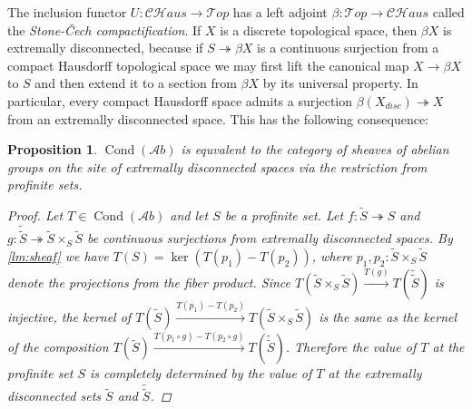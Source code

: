 \documentclass[11pt,A4]{article}
\theoremstyle{plain}
\newtheorem{prop}[thm]{Proposition}
\theoremstyle{definition}
\theoremstyle{remark}
\newcommand{\Top}{\mathscr{T}op}
\newcommand{\CHaus}{\mathscr{CH}aus}
\newcommand{\Ab}{\mathscr{A}b}
\DeclareMathOperator{\Cond}{Cond}
\newcommand{\fp}[1]{\times_{#1}}
\begin{document}
The inclusion functor $U\colon \CHaus\to \Top$ has a left adjoint $\beta\colon \Top\to \CHaus$ called the \textit{Stone-\v{C}ech compactification}.
If $X$ is a discrete topological space, then $\beta X$ is extremally disconnected, because if $S\twoheadrightarrow \beta X$ is a continuous surjection from a compact Hausdorff topological space we may first lift the canonical map $X\to \beta X$ to $S$ and then extend it to a section from $\beta X$ by its universal property.
In particular, every compact Hausdorff space admits a surjection $\beta(X_{disc})\twoheadrightarrow X$ from an extremally disconnected space.
This has the following consequence:

\begin{prop}
    $\Cond(\Ab)$ is equvalent to the category of sheaves of abelian groups on the site of extremally disconnected spaces via the restriction from profinite sets.
    \begin{proof}
	Let $T\in \Cond(\Ab)$ and let $S$ be a profinite set.
	Let $f\colon \tilde{S}\twoheadrightarrow S$ and $g\colon \tilde{\tilde{S}}\twoheadrightarrow \tilde{S}\fp{S}\tilde{S}$ be continuous surjections from extremally disconnected spaces.
	By \cref{lm:sheaf} we have $T(S)=\ker(T(p_{1})-T(p_{2}))$, where $p_{1},p_{2}\colon \tilde{S}\fp{S}\tilde{S}$ denote the projections from the fiber product.
	Since $T(\tilde{S}\fp{S}\tilde{S})\xrightarrow{T(g)} T(\tilde{\tilde{S}})$ is injective, the kernel of $T(\tilde{S})\xrightarrow{T(p_{1})-T(p_{2})} T(\tilde{S}\fp{S}\tilde{S})$ is the same as the kernel of the composition $T(\tilde{S})\xrightarrow{T(p_{1}\circ g)-T(p_{2}\circ g)} T(\tilde{\tilde{S}})$.
	Therefore the value of $T$ at the profinite set $S$ is completely determined by the value of $T$ at the extremally disconnected sets $\tilde{S}$ and $\tilde{\tilde{S}}$.
    \end{proof}
\end{prop}
\end{document}
